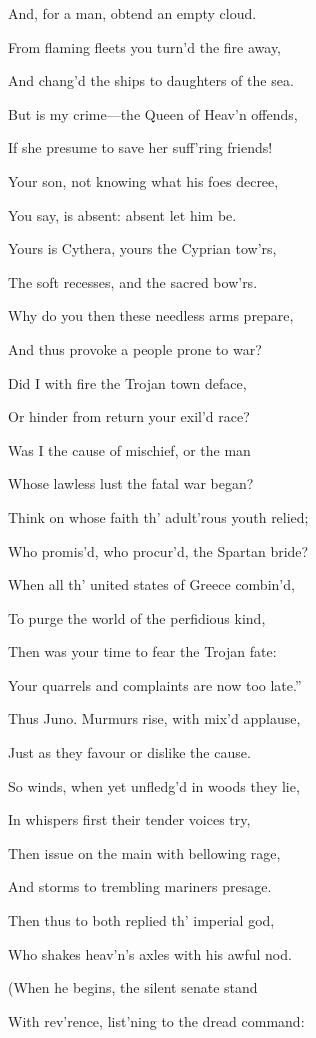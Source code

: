 And, for a man, obtend an empty cloud.

From flaming fleets you turn’d the fire away,

And chang’d the ships to daughters of the sea.

But is my crime—the Queen of Heav’n offends,

If she presume to save her suff’ring friends!

Your son, not knowing what his foes decree,

You say, is absent: absent let him be.

Yours is Cythera, yours the Cyprian tow’rs,

The soft recesses, and the sacred bow’rs.

Why do you then these needless arms prepare,

And thus provoke a people prone to war?

Did I with fire the Trojan town deface,

Or hinder from return your exil’d race?

Was I the cause of mischief, or the man

Whose lawless lust the fatal war began?

Think on whose faith th’ adult’rous youth relied;

Who promis’d, who procur’d, the Spartan bride?

When all th’ united states of Greece combin’d,

To purge the world of the perfidious kind,

Then was your time to fear the Trojan fate:

Your quarrels and complaints are now too late.”

Thus Juno. Murmurs rise, with mix’d applause,

Just as they favour or dislike the cause.

So winds, when yet unfledg’d in woods they lie,

In whispers first their tender voices try,

Then issue on the main with bellowing rage,

And storms to trembling mariners presage.

Then thus to both replied th’ imperial god,

Who shakes heav’n’s axles with his awful nod.

(When he begins, the silent senate stand

With rev’rence, list’ning to the dread command:

